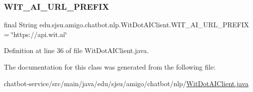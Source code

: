 \subsubsection{\texorpdfstring{W\+I\+T\+\_\+\+A\+I\+\_\+\+U\+R\+L\+\_\+\+P\+R\+E\+F\+IX}{WIT\_AI\_URL\_PREFIX}}
{\footnotesize\ttfamily final String edu.\+sjsu.\+amigo.\+chatbot.\+nlp.\+Wit\+Dot\+A\+I\+Client.\+W\+I\+T\+\_\+\+A\+I\+\_\+\+U\+R\+L\+\_\+\+P\+R\+E\+F\+IX = \char`\"{}https\+://api.\+wit.\+ai\char`\"{}\hspace{0.3cm}{\ttfamily [static]}}



Definition at line 36 of file Wit\+Dot\+A\+I\+Client.\+java.



The documentation for this class was generated from the following file\+:\begin{DoxyCompactItemize}
\item 
chatbot-\/service/src/main/java/edu/sjsu/amigo/chatbot/nlp/\hyperlink{_wit_dot_a_i_client_8java}{Wit\+Dot\+A\+I\+Client.\+java}\end{DoxyCompactItemize}
